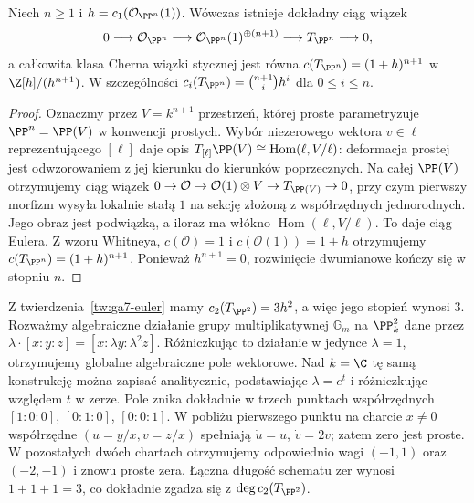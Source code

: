 \begin{twierdzenie}
\label{tw:ga7-euler}
Niech $n\ge1$ i $h=c_1(\mathcal O_{\PP^n}(1))$.
Wówczas istnieje dokładny ciąg wiązek
\[
0\longrightarrow\mathcal O_{\PP^n}
\longrightarrow\mathcal O_{\PP^n}(1)^{\oplus(n+1)}
\longrightarrow T_{\PP^n}\longrightarrow0,
\]
a całkowita klasa Cherna wiązki stycznej jest równa
$c(T_{\PP^n})=(1+h)^{n+1}$ w
$\Z[h]/(h^{n+1})$. W szczególności
$c_i(T_{\PP^n})=\binom{n+1}{i}h^i$ dla $0\le i\le n$.
\end{twierdzenie}
\begin{proof}
Oznaczmy przez $V=k^{n+1}$ przestrzeń, której proste
parametryzuje $\PP^n=\PP(V)$ w konwencji prostych.
Wybór niezerowego wektora $v\in\ell$ reprezentującego
$[\ell]$ daje opis
$T_{[\ell]}\PP(V)\cong\operatorname{Hom}(\ell,V/\ell)$:
deformacja prostej jest odwzorowaniem z jej kierunku
do kierunków poprzecznych. Na całej $\PP(V)$ otrzymujemy
ciąg wiązek
$0\to\mathcal O\to\mathcal O(1)\otimes V
\to T_{\PP(V)}\to0$, przy czym pierwszy morfizm
wysyła lokalnie stałą $1$ na sekcję złożoną z
współrzędnych jednorodnych. Jego obraz jest podwiązką,
a iloraz ma włókno $\operatorname{Hom}(\ell,V/\ell)$.
To daje ciąg Eulera. Z wzoru Whitneya,
$c(\mathcal O)=1$ i $c(\mathcal O(1))=1+h$
otrzymujemy $c(T_{\PP^n})=(1+h)^{n+1}$.
Ponieważ $h^{n+1}=0$, rozwinięcie dwumianowe
kończy się w stopniu $n$.
\end{proof}

\begin{przyklad}
\label{prz:ga7-vector-field}
Z twierdzenia~\ref{tw:ga7-euler} mamy
$c_2(T_{\PP^2})=3h^2$, a więc jego stopień wynosi $3$.
Rozważmy algebraiczne działanie grupy multiplikatywnej
$\mathbb G_m$ na $\PP^2_k$ dane przez
$\lambda\cdot[x:y:z]=[x:\lambda y:\lambda^2 z]$.
Różniczkując to działanie w jedynce $\lambda=1$,
otrzymujemy globalne algebraiczne pole wektorowe.
Nad $k=\C$ tę samą konstrukcję można zapisać
analitycznie, podstawiając $\lambda=e^t$
i różniczkując względem $t$ w zerze.
Pole znika dokładnie w trzech punktach współrzędnych
$[1:0:0]$, $[0:1:0]$, $[0:0:1]$.
W pobliżu pierwszego punktu na charcie $x\ne0$
współrzędne $(u=y/x,v=z/x)$ spełniają
$\dot u=u$, $\dot v=2v$; zatem zero jest proste.
W pozostałych dwóch chartach otrzymujemy odpowiednio
wagi $(-1,1)$ oraz $(-2,-1)$ i znowu proste zera.
Łączna długość schematu zer wynosi $1+1+1=3$,
co dokładnie zgadza się z $\deg c_2(T_{\PP^2})$.
\end{przyklad}

